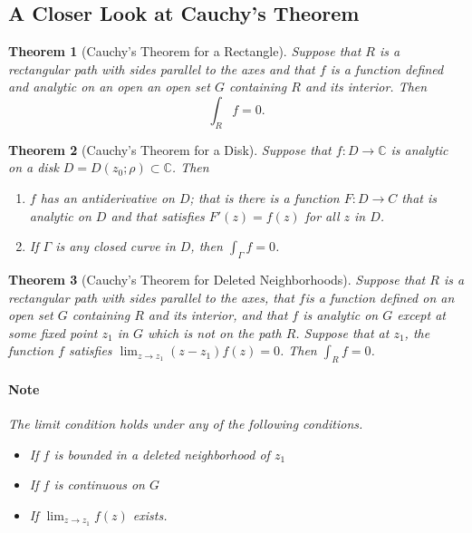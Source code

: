 \documentclass[a4paper]{article}
\newtheorem{theorem}{Theorem}
\newcommand{\C}{\mathbb{C}}
\begin{document}
\subsection{A Closer Look at Cauchy's Theorem}

\begin{theorem}[Cauchy's Theorem for a Rectangle]
  Suppose that \(R\) is a rectangular path with sides parallel to the axes and that \(f\)  is a function defined and analytic on an open an open set \(G\) containing \(R\) and its interior.
  Then 
  \[\int_R f = 0.\]

\end{theorem}

\begin{theorem}[Cauchy's Theorem for a Disk]
  Suppose that \(f : D \to \C\) is analytic on a disk \(D = D(z_0; \rho) \subset \C\).
  Then
  \begin{enumerate}
    \item \(f\) has an antiderivative on \(D\); that is there is a function \(F : D \to C\) that is analytic on \(D\) and that satisfies \(F'(z) = f(z)\) for all \(z\) in \(D\).
    \item If \(\Gamma\) is any closed curve in \(D\), then \(\int_\Gamma f = 0\).
  \end{enumerate}

\end{theorem}

\begin{theorem}[Cauchy's Theorem for Deleted Neighborhoods]
  Suppose that \(R\) is a rectangular path with sides parallel to the axes, that \(f\)is a function defined on an open set  \(G\) containing \(R\) and its interior, and that \(f\) is analytic on \(G\) except at some fixed point \(z_1\) in \(G\) which is not on the path \(R\). 
  Suppose that at \(z_1\), the function \(f\) satisfies \(\lim_{z \to z_1} (z - z_1) f(z) = 0 \). 
  Then \(\int_R f = 0\).

  \paragraph{Note}
  The limit condition holds under any of the following conditions.
  \begin{itemize}
    \item If \(f\) is bounded in a deleted neighborhood of \(z_1\)
    \item If \(f\) is continuous on  \(G\)
    \item If \(\lim_{z \to z_1} f(z)\) exists. 
  \end{itemize}
\end{theorem}
\end{document}
